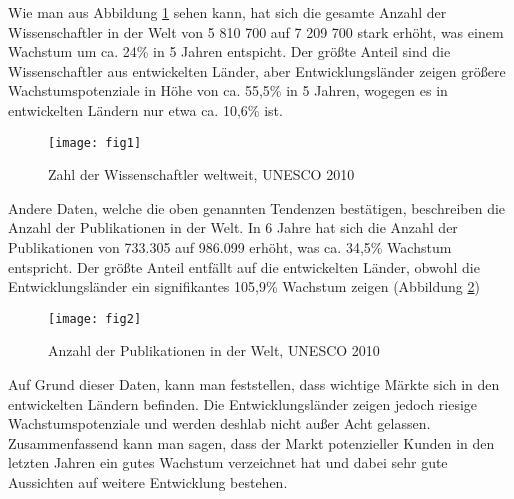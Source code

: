 Wie man aus Abbildung \ref{fig:fig1} sehen kann, hat sich die gesamte Anzahl der Wissenschaftler in der Welt von 5 810 700 auf 7 209 700 stark erhöht, was einem Wachstum um ca. 24\% in 5 Jahren entspicht. Der größte Anteil sind die Wissenschaftler aus entwickelten Länder, aber Entwicklungsländer zeigen größere Wachstumspotenziale in Höhe von ca. 55,5\% in 5 Jahren, wogegen es in entwickelten Ländern nur etwa  ca. 10,6\% ist.\\
\begin{figure}[h!]
\centering
\texttt{[image: fig1]}
\caption{Zahl der Wissenschaftler weltweit, UNESCO 2010}
\label{fig:fig1}
\end{figure}
Andere Daten, welche die oben genannten Tendenzen bestätigen, beschreiben die Anzahl der Publikationen in der Welt. In 6 Jahre hat sich die Anzahl der Publikationen von 733.305 auf 986.099 erhöht, was ca. 34,5\% Wachstum entspricht. Der größte Anteil entfällt auf die entwickelten Länder, obwohl die Entwicklungsländer ein signifikantes 105,9\% Wachstum zeigen (Abbildung \ref{fig:fig2})\\
\begin{figure}[h!]
\centering
\texttt{[image: fig2]}
\caption{Anzahl der Publikationen in der Welt, UNESCO 2010}
\label{fig:fig2}
\end{figure}
Auf Grund dieser Daten, kann man feststellen, dass  wichtige Märkte sich in den entwickelten Ländern befinden. Die Entwicklungsländer zeigen jedoch riesige Wachstumspotenziale und werden deshlab nicht außer Acht gelassen. 
Zusammenfassend kann man sagen, dass der Markt potenzieller Kunden in den letzten Jahren ein gutes Wachstum verzeichnet hat und dabei sehr gute Aussichten auf weitere Entwicklung bestehen.

